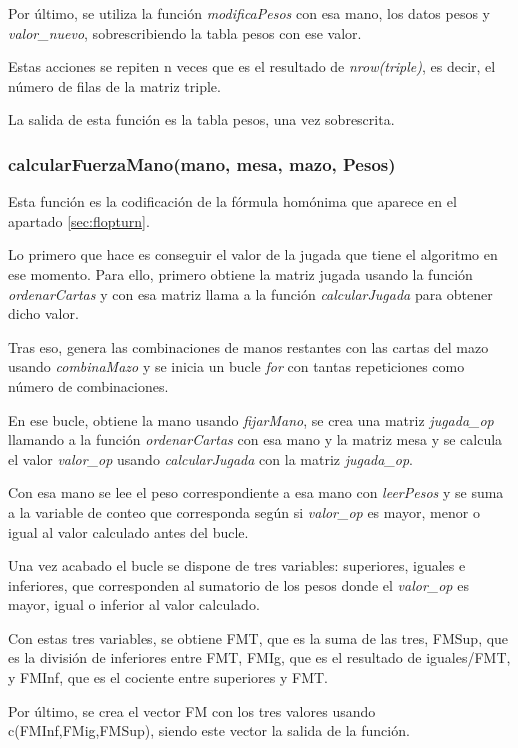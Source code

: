 Por último, se utiliza la función \textit{modificaPesos} con esa mano, los datos pesos y \textit{valor\_nuevo}, sobrescribiendo la tabla pesos con ese valor.

Estas acciones se repiten n veces que es el resultado de \textit{nrow(triple)}, es decir, el número de filas de la matriz triple.

La salida de esta función es la tabla pesos, una vez sobrescrita.

\subsubsection{calcularFuerzaMano(mano, mesa, mazo, Pesos)}

Esta función es la codificación de la fórmula homónima que aparece en el apartado \ref{sec:flopturn}.

Lo primero que hace es conseguir el valor de la jugada que tiene el algoritmo en ese momento. Para ello, primero obtiene la matriz jugada usando la función \textit{ordenarCartas} y con esa matriz llama a la función \textit{calcularJugada} para obtener dicho valor.

Tras eso, genera las combinaciones de manos restantes con las cartas del mazo usando \textit{combinaMazo} y se inicia un bucle \textit{for} con tantas repeticiones como número de combinaciones.

En ese bucle, obtiene la mano usando \textit{fijarMano}, se crea una matriz \textit{jugada\_op} llamando a la función \textit{ordenarCartas} con esa mano y la matriz mesa y se calcula el valor \textit{valor\_op} usando \textit{calcularJugada} con la matriz \textit{jugada\_op}.

Con esa mano se lee el peso correspondiente a esa mano con \textit{leerPesos} y se suma a la variable de conteo que corresponda según si \textit{valor\_op} es mayor, menor o igual al valor calculado antes del bucle.

Una vez acabado el bucle se dispone de tres variables: superiores, iguales e inferiores, que corresponden al sumatorio de los pesos donde el \textit{valor\_op} es mayor, igual o inferior al valor calculado.

Con estas tres variables, se obtiene FMT, que es la suma de las tres, FMSup, que es la división de inferiores entre FMT, FMIg, que es el resultado de iguales/FMT, y FMInf, que es el cociente entre superiores y FMT.

Por último, se crea el vector FM con los tres valores usando c(FMInf,FMig,FMSup), siendo este vector la salida de la función.

